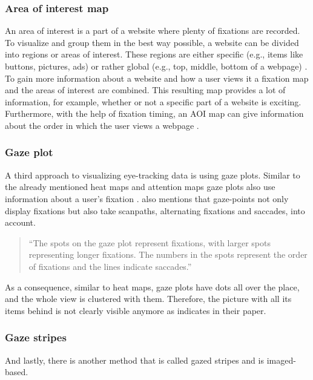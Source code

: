 \subsubsection{Area of interest map}
An area of interest is a part of a website where plenty of fixations are recorded. To visualize and group them in the best way possible, a website can be divided into regions or areas of interest. These regions are either specific (e.g., items like buttons, pictures, ads) or rather global (e.g., top, middle, bottom of a webpage) \autocite[]{gonzalez2011different, djamasbi2014eye}. To gain more information about a website and how a user views it a fixation map and the areas of interest are combined. This resulting map provides a lot of information, for example, whether or not a specific part of a website is exciting. Furthermore, with the help of fixation timing, an AOI map can give information about the order in which the user views a webpage \autocite[]{djamasbi2014eye}.

\subsubsection{Gaze plot}
A third approach to visualizing eye-tracking data is using gaze plots. Similar to the already mentioned heat maps and attention maps gaze plots also use information about a user's fixation \autocite[]{kurzhals2016gaze}. \textcite[]{kurzhals2016gaze} also mentions that gaze-points not only display fixations but also take scanpaths, alternating fixations and saccades, into account. 

\begin{quote}
``The spots on the gaze plot represent fixations, with larger spots representing longer fixations. The numbers in the spots represent the order of fixations and the lines indicate saccades.''
\autocite[]{djamasbi2014eye}
\end{quote}

As a consequence, similar to heat maps, gaze plots have dots all over the place, and the whole view is clustered with them. Therefore, the picture with all its items behind is not clearly visible anymore as \textcite[]{djamasbi2014eye} indicates in their paper.

\subsubsection{Gaze stripes}
And lastly, there is another method that is called gazed stripes and is imaged-based.

